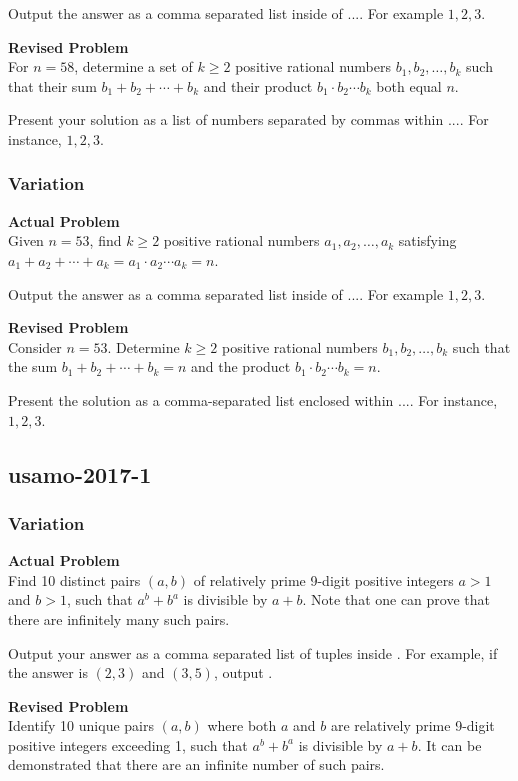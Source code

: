 Output the answer as a comma separated list inside of $\boxed{...}$. For example $\boxed{1, 2, 3}$.

\textbf{Revised Problem}\\
For $n = 58$, determine a set of $k\ge 2$ positive rational numbers $b_1, b_2, \ldots, b_k$ such that their sum $b_1 + b_2 + \cdots + b_k$ and their product $b_1 \cdot b_2 \cdots b_k$ both equal $n$.

Present your solution as a list of numbers separated by commas within $\boxed{...}$. For instance, $\boxed{1, 2, 3}$.

\subsubsection{Variation}
\textbf{Actual Problem}\\
Given $n = 53$, find $k\ge 2$ positive rational numbers $a_1, a_2, \ldots, a_k$ satisfying $a_1 + a_2 + \cdots + a_k = a_1\cdot a_2\cdots a_k = n$.

Output the answer as a comma separated list inside of $\boxed{...}$. For example $\boxed{1, 2, 3}$.

\textbf{Revised Problem}\\
Consider \( n = 53 \). Determine \( k \geq 2 \) positive rational numbers \( b_1, b_2, \ldots, b_k \) such that the sum \( b_1 + b_2 + \cdots + b_k = n \) and the product \( b_1 \cdot b_2 \cdots b_k = n \).

Present the solution as a comma-separated list enclosed within \(\boxed{...}\). For instance, \(\boxed{1, 2, 3}\).

\subsection{usamo-2017-1}
\subsubsection{Variation}
\textbf{Actual Problem}\\
Find 10 distinct pairs $(a,b)$ of relatively prime 9-digit positive integers $a>1$ and $b>1$, such that $a^b+b^a$ is divisible by $a+b$. Note that one can prove that there are infinitely many such pairs.

Output your answer as a comma separated list of tuples inside . For example, if the answer is $(2,3)$ and $(3,5)$, output .

\textbf{Revised Problem}\\
Identify 10 unique pairs \((a,b)\) where both \(a\) and \(b\) are relatively prime 9-digit positive integers exceeding 1, such that \(a^b + b^a\) is divisible by \(a+b\). It can be demonstrated that there are an infinite number of such pairs.

